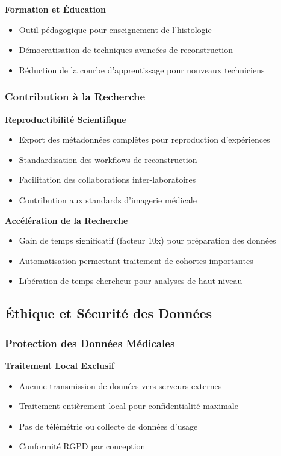 \documentclass[12pt,a4paper]{report}
\begin{document}
\textbf{Formation et Éducation}
\begin{itemize}
\item Outil pédagogique pour enseignement de l'histologie
\item Démocratisation de techniques avancées de reconstruction
\item Réduction de la courbe d'apprentissage pour nouveaux techniciens
\end{itemize}

\subsubsection{Contribution à la Recherche}

\textbf{Reproductibilité Scientifique}
\begin{itemize}
\item Export des métadonnées complètes pour reproduction d'expériences
\item Standardisation des workflows de reconstruction
\item Facilitation des collaborations inter-laboratoires
\item Contribution aux standards d'imagerie médicale
\end{itemize}

\textbf{Accélération de la Recherche}
\begin{itemize}
\item Gain de temps significatif (facteur 10x) pour préparation des données
\item Automatisation permettant traitement de cohortes importantes
\item Libération de temps chercheur pour analyses de haut niveau
\end{itemize}

\subsection{Éthique et Sécurité des Données}

\subsubsection{Protection des Données Médicales}

\textbf{Traitement Local Exclusif}
\begin{itemize}
\item Aucune transmission de données vers serveurs externes
\item Traitement entièrement local pour confidentialité maximale
\item Pas de télémétrie ou collecte de données d'usage
\item Conformité RGPD par conception
\end{itemize}
\end{document}
